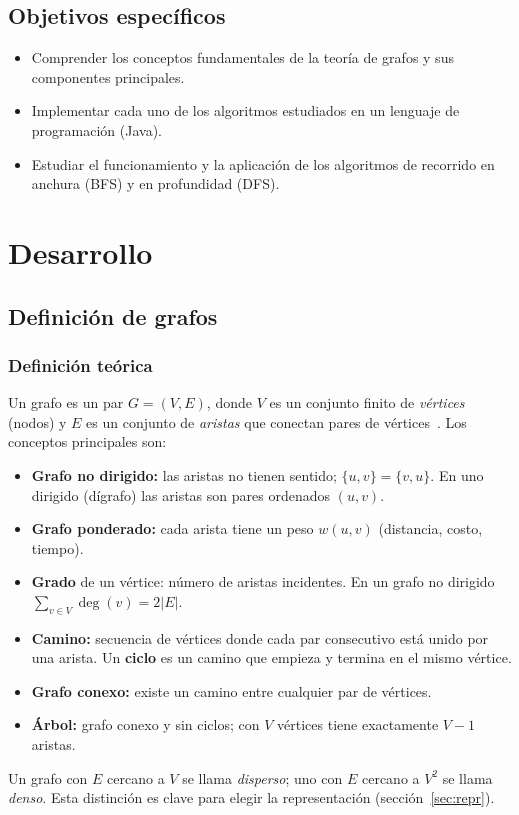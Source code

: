 \documentclass[conference]{IEEEtran}
\begin{document}
\subsection{Objetivos específicos}
\begin{itemize}
  \item Comprender los conceptos fundamentales de la teoría de grafos y sus componentes principales.
  \item Implementar cada uno de los algoritmos estudiados en un lenguaje de programación (Java).
  \item Estudiar el funcionamiento y la aplicación de los algoritmos de recorrido en anchura (BFS) y en profundidad (DFS).
\end{itemize}

\section{Desarrollo}

\subsection{Definición de grafos}
\subsubsection{Definición teórica}
Un grafo es un par $G=(V,E)$, donde $V$ es un conjunto finito de \emph{vértices} (nodos) y $E$ es un conjunto de \emph{aristas} que conectan pares de vértices~\cite{diestel,rosen}. Los conceptos principales son:
\begin{itemize}
  \item \textbf{Grafo no dirigido:} las aristas no tienen sentido; $\{u,v\}=\{v,u\}$. En uno dirigido (dígrafo) las aristas son pares ordenados $(u,v)$.
  \item \textbf{Grafo ponderado:} cada arista tiene un peso $w(u,v)$ (distancia, costo, tiempo).
  \item \textbf{Grado} de un vértice: número de aristas incidentes. En un grafo no dirigido $\sum_{v\in V}\deg(v)=2|E|$.
  \item \textbf{Camino:} secuencia de vértices donde cada par consecutivo está unido por una arista. Un \textbf{ciclo} es un camino que empieza y termina en el mismo vértice.
  \item \textbf{Grafo conexo:} existe un camino entre cualquier par de vértices.
  \item \textbf{Árbol:} grafo conexo y sin ciclos; con $V$ vértices tiene exactamente $V-1$ aristas.
\end{itemize}
Un grafo con $E$ cercano a $V$ se llama \emph{disperso}; uno con $E$ cercano a $V^2$ se llama \emph{denso}. Esta distinción es clave para elegir la representación (sección~\ref{sec:repr}).
\end{document}
